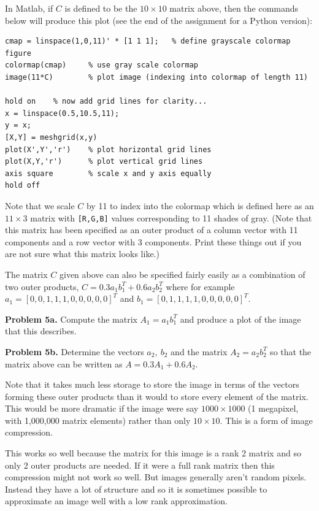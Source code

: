 \documentclass[10pt]{article}
\begin{document}
In Matlab, if $C$ is defined to be the $10 \times 10$ matrix above, then the
commands below will produce this plot (see the end of the assignment for a
Python version):

\begin{verbatim}
cmap = linspace(1,0,11)' * [1 1 1];   % define grayscale colormap
figure
colormap(cmap)     % use gray scale colormap
image(11*C)        % plot image (indexing into colormap of length 11)

hold on    % now add grid lines for clarity...
x = linspace(0.5,10.5,11);
y = x;
[X,Y] = meshgrid(x,y)
plot(X',Y','r')    % plot horizontal grid lines
plot(X,Y,'r')      % plot vertical grid lines
axis square        % scale x and y axis equally
hold off
\end{verbatim} 

Note that we scale $C$ by 11 to index into the colormap which is defined here
as an $11 \times 3$ matrix with {\tt [R,G,B]} values corresponding to 11
shades of gray.  (Note that this matrix has been specified as an outer product
of a column vector with 11 components and a row vector with 3 components.
Print these things out if you are not sure what this matrix looks like.)

The matrix $C$ given above can also be specified fairly easily as a
combination of two outer products, $C = 0.3a_1b_1^T + 0.6a_2b_2^T$ where
for example $a_1 = [0,0,1,1,1,0,0,0,0,0]^T$ and $b_1 =
[0,1,1,1,1,0,0,0,0,0]^T$. 

{\bf Problem 5a.} Compute the matrix $A_1 = a_1b_1^T$ and produce a plot of the image
that this describes.  

{\bf Problem 5b.} Determine the vectors $a_2,~ b_2$ and the matrix $A_2 = a_2b_2^T$
so that the matrix above can be written as $A = 0.3A_1 + 0.6A_2$.  

Note that it takes much less storage to store the image in terms of the
vectors forming these outer products than it would to store every element of
the matrix.  This would be more dramatic if the image were say $1000 \times
1000$ (1 megapixel, with 1,000,000 matrix elements) rather than only
$10\times 10$.  This is a form of image compression. 

This works so well because the matrix for this image is a rank 2
matrix and so only 2 outer products are needed.  If it were a full
rank matrix then this compression might not work so well. But images
generally aren't random pixels.  Instead they have a lot of structure
and so it is sometimes possible to approximate an image well with
a low rank approximation.
\end{document}

